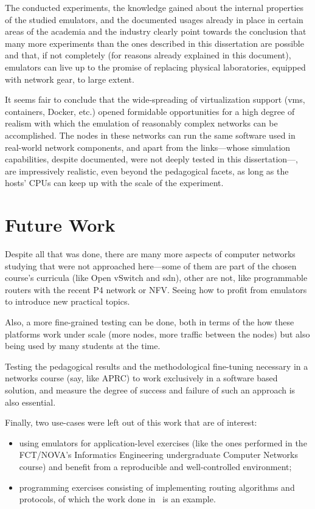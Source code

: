 The conducted experiments, the knowledge gained about the internal properties of the studied emulators, and the documented usages already in place in certain areas of the academia and the industry clearly point towards the conclusion that many more experiments than the ones described in this dissertation are possible and that, if not completely (for reasons already explained in this document), emulators can live up to the promise of replacing physical laboratories, equipped with network gear, to large extent.

It seems fair to conclude that the wide-spreading of virtualization support (\glspl{vm}, containers, Docker, etc.) opened formidable opportunities for a high degree of realism with which the emulation of reasonably complex networks can be accomplished.
The nodes in these networks can run the same software used in real-world network components, and apart from the links---whose simulation capabilities, despite documented, were not deeply tested in this dissertation---, are impressively realistic, even beyond the pedagogical facets, as long as the hosts' CPUs can keep up with the scale of the experiment.

\section{Future Work}

Despite all that was done, there are many more aspects of computer networks studying that were not approached here---some of them are part of the chosen course's curricula (like Open vSwitch and \gls{sdn}), other are not, like programmable routers with the recent P4 network or NFV.
Seeing how to profit from emulators to introduce new practical topics.

Also, a more fine-grained testing can be done, both in terms of the how these platforms work under scale (more nodes, more traffic between the nodes) but also being used by many students at the time.

Testing the pedagogical results and the methodological fine-tuning necessary in a networks course (say, like APRC) to work exclusively in a software based solution, and measure the degree of success and failure of such an approach is also essential.

Finally, two use-cases were left out of this work that are of interest:
\begin{itemize}
  \item using emulators for application-level exercises (like the ones performed in the FCT/NOVA's Informatics Engineering undergraduate Computer Networks course) and benefit from a reproducible and well-controlled environment;
  \item programming exercises consisting of implementing routing algorithms and protocols, of which the work done in~\cite{teachandlearnmininet} is an example.
\end{itemize}

